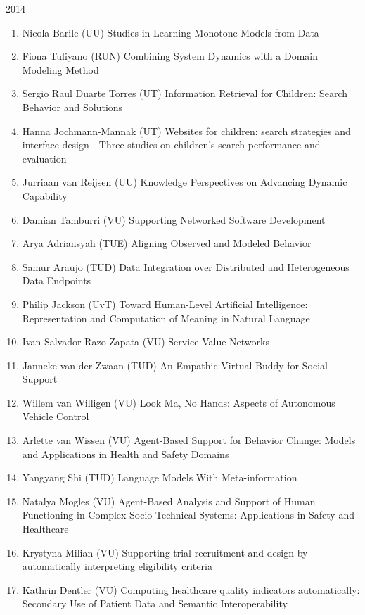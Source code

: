 \begin{multicols}{2}
\begin{scriptsize}
\vspace{0.2cm}
2014
\vspace{0.2cm}
\begin{enumerate}[leftmargin=*,noitemsep,topsep=0pt,parsep=1pt,partopsep=0pt]
\renewcommand{\labelenumi}{2014-\arabic{enumi}}
\item Nicola Barile (UU) Studies in Learning Monotone Models from Data
\item Fiona Tuliyano (RUN) Combining System Dynamics with a Domain Modeling Method
\item Sergio Raul Duarte Torres (UT) Information Retrieval for Children: Search Behavior and Solutions
\item Hanna Jochmann-Mannak (UT) Websites for children: search strategies and interface design - Three studies on children's search performance and evaluation
\item Jurriaan van Reijsen (UU) Knowledge Perspectives on Advancing Dynamic Capability
\item Damian Tamburri (VU) Supporting Networked Software Development 
\item Arya Adriansyah (TUE) Aligning Observed and Modeled Behavior
\item Samur Araujo (TUD) Data Integration over Distributed and Heterogeneous Data Endpoints
\item Philip Jackson (UvT) Toward Human-Level Artificial Intelligence: Representation and Computation of Meaning in Natural Language
\item Ivan Salvador Razo Zapata (VU) Service Value Networks
\item Janneke van der Zwaan (TUD) An Empathic Virtual Buddy for Social Support
\item Willem van Willigen (VU) Look Ma, No Hands: Aspects of Autonomous Vehicle Control
\item Arlette van Wissen (VU) Agent-Based Support for Behavior Change: Models and Applications in Health and Safety Domains
\item Yangyang Shi (TUD) Language Models With Meta-information
\item Natalya Mogles (VU) Agent-Based Analysis and Support of Human Functioning in Complex Socio-Technical Systems: Applications in Safety and Healthcare
\item Krystyna Milian (VU) Supporting trial recruitment and design by automatically interpreting eligibility criteria
\item Kathrin Dentler (VU) Computing healthcare quality indicators automatically: Secondary Use of Patient Data and Semantic Interoperability

\end{enumerate}
\end{scriptsize}
\end{multicols}
